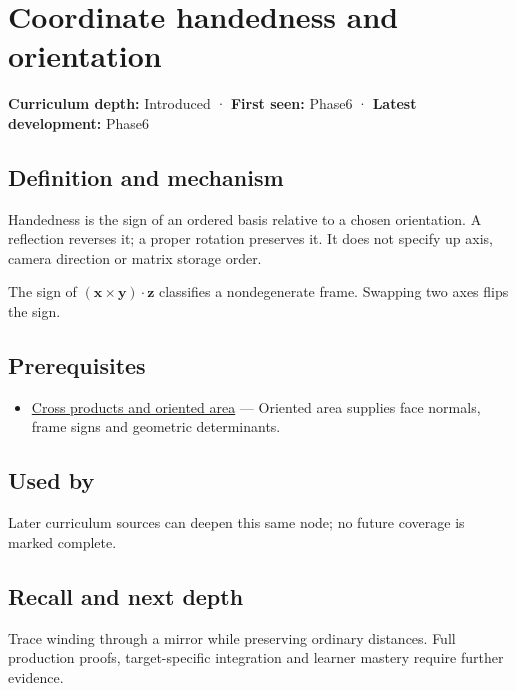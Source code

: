 \hypertarget{appendix-87d7626c8d37}{}
\section{Coordinate handedness and orientation}\label{appendix-87d7626c8d37-coordinate-handedness-and-orientation}

\textbf{Curriculum depth:} Introduced · \textbf{First seen:} Phase6 · \textbf{Latest development:} Phase6

\subsection{Definition and mechanism}\label{appendix-87d7626c8d37-definition-and-mechanism}

Handedness is the sign of an ordered basis relative to a chosen orientation. A reflection reverses it; a proper rotation preserves it. It does not specify up axis, camera direction or matrix storage order.

The sign of \((\mathbf x\times\mathbf y)\cdot\mathbf z\) classifies a nondegenerate frame. Swapping two axes flips the sign.

\subsection{Prerequisites}\label{appendix-87d7626c8d37-prerequisites}

\begin{itemize}
\tightlist
\item
  \hyperref[appendix-2391db8052b1]{Cross products and oriented area} --- Oriented area supplies face normals, frame signs and geometric determinants.
\end{itemize}

\subsection{Used by}\label{appendix-87d7626c8d37-used-by}

Later curriculum sources can deepen this same node; no future coverage is marked complete.

\subsection{Recall and next depth}\label{appendix-87d7626c8d37-recall-and-next-depth}

Trace winding through a mirror while preserving ordinary distances. Full production proofs, target-specific integration and learner mastery require further evidence.

